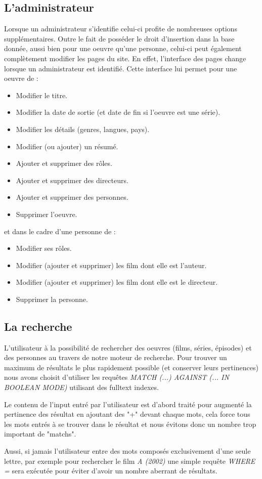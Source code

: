 \documentclass[10pt,a4paper]{article}
\begin{document}
\subsection{L'administrateur}
Lorsque un administrateur s'identifie celui-ci profite de nombreuses options supplémentaires. Outre le fait de posséder le droit d'insertion dans la base donnée, aussi bien pour une oeuvre qu'une personne, celui-ci peut également complètement modifier les pages du site. En effet, l'interface des pages change lorsque un administrateur est identifié. Cette interface lui permet pour une oeuvre de :
\vskip 3pt
\begin{itemize}
\item Modifier le titre.
\item Modifier la date de sortie (et date de fin si l'oeuvre est une série).
\item Modifier les détails (genres, langues, pays).
\item Modifier (ou ajouter) un résumé.
\item Ajouter et supprimer des rôles.
\item Ajouter et supprimer des directeurs.
\item Ajouter et supprimer des personnes.
\item Supprimer l'oeuvre.
\end{itemize}

\vskip 10pt
et dans le cadre d'une personne de :
\begin{itemize}
\item Modifier ses rôles.
\item Modifier (ajouter et supprimer) les film dont elle est l’auteur.
\item Modifier (ajouter et supprimer) les film dont elle est le directeur.
\item Supprimer la personne.
\end{itemize}

\subsection{La recherche}

L'utilisateur à la possibilité de rechercher des oeuvres (films, séries, épisodes) et des personnes au travers de notre moteur de recherche. Pour trouver un maximum de résultats le plus rapidement possible (et conserver leurs pertinences) nous avons choisit d'utiliser les requêtes \textit{MATCH (...) AGAINST (... IN BOOLEAN MODE)} utilisant des fulltext indexes. 
\par 
Le contenu de l'input entré par l'utilisateur est d'abord traité pour augmenté la pertinence des résultat en ajoutant des "+" devant chaque mots, cela force tous les mots entrés à se trouver dans le résultat et nous évitons donc un nombre trop important de "matchs".
\par
Aussi, si jamais l'utilisateur entre des mots composés exclusivement d'une seule lettre, par exemple pour rechercher le film \textit{A (2002)} une simple requête \textit{WHERE = }
sera exécutée pour éviter d'avoir un nombre aberrant de résultats.
\end{document}
